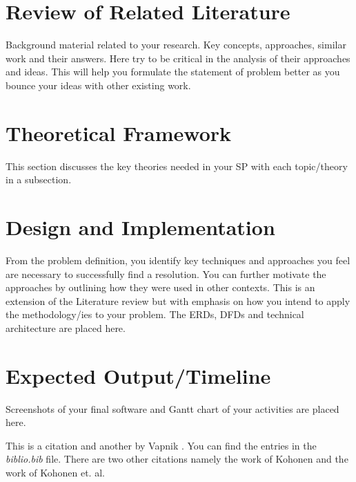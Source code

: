 \documentclass[11pt,a4paper,titlepage]{article}
\let\stdsection\section
\renewcommand\section{\newpage\stdsection}
\begin{document}
\section{Review of Related Literature}

Background material related to your research. Key concepts, approaches, similar work and their answers. Here try to be critical in the analysis of their approaches and ideas. This will help you formulate the statement of problem better as you bounce your ideas with other existing work.

\section{Theoretical Framework}

This section discusses the key theories needed in your SP with each topic/theory in a subsection.

\section{Design and Implementation}
From the problem definition, you identify key techniques and approaches you feel are necessary to successfully find a resolution. You can further motivate the approaches by outlining how they were used in other contexts. This is an extension of the Literature review but with emphasis on how you intend to apply the methodology/ies to your problem. The ERDs, DFDs and technical architecture are placed here.

\section{Expected Output/Timeline}

Screenshots of your final software and Gantt chart of your activities are placed here.


This is a citation \cite{Pavlovic} and another by Vapnik \cite{Vapnik}. You can find the entries in the {\it biblio.bib} file. There are two other citations namely the work of Kohonen \cite{Kohonen2} and the work of Kohonen et. al. \cite{Kohonen1}

\clearpage


\end{document}
